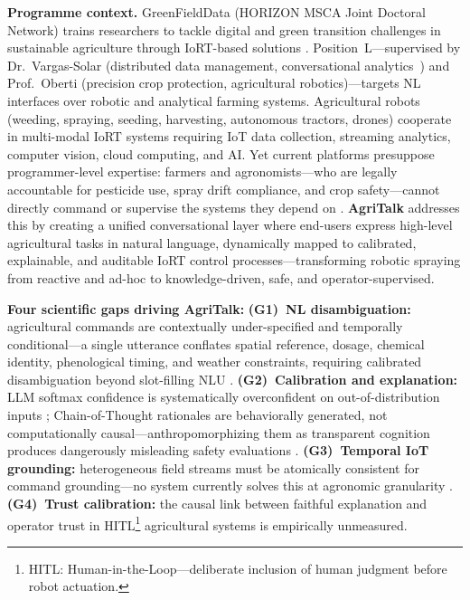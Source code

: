 \documentclass[11pt,a4paper]{article}
\begin{document}
\textbf{Programme context.}
GreenFieldData (HORIZON MSCA Joint Doctoral Network) trains researchers to tackle digital and green transition challenges in sustainable agriculture through IoRT-based solutions \citep{phd_adv_2026}.
Position~L---supervised by Dr.\ Vargas-Solar (distributed data management, conversational analytics~\citep{vargas_solar_2021}) and Prof.\ Oberti (precision crop protection, agricultural robotics)---targets NL interfaces over robotic and analytical farming systems.
Agricultural robots (weeding, spraying, seeding, harvesting, autonomous tractors, drones) cooperate in multi-modal IoRT systems requiring IoT data collection, streaming analytics, computer vision, cloud computing, and AI.
Yet current platforms presuppose programmer-level expertise: farmers and agronomists---who are legally accountable for pesticide use, spray drift compliance, and crop safety---cannot directly command or supervise the systems they depend on \citep{chen_2021,wagner_2025}.
\textbf{AgriTalk} addresses this by creating a unified conversational layer where end-users express high-level agricultural tasks in natural language, dynamically mapped to calibrated, explainable, and auditable IoRT control processes---transforming robotic spraying from reactive and ad-hoc to knowledge-driven, safe, and operator-supervised.

\textbf{Four scientific gaps driving AgriTalk:}
\textbf{(G1)~NL disambiguation:} agricultural commands are contextually under-specified and temporally conditional---a single utterance conflates spatial reference, dosage, chemical identity, phenological timing, and weather constraints, requiring calibrated disambiguation beyond slot-filling NLU \citep{chen_2021}.
\textbf{(G2)~Calibration and explanation:} LLM softmax confidence is systematically overconfident on out-of-distribution inputs \citep{guo_calibration_2017}; Chain-of-Thought rationales are behaviorally generated, not computationally causal---anthropomorphizing them as transparent cognition produces dangerously misleading safety evaluations \citep{turpin_2023,kambhampati_2025}.
\textbf{(G3)~Temporal IoT grounding:} heterogeneous field streams must be atomically consistent for command grounding---no system currently solves this at agronomic granularity \citep{vargas_solar_2021}.
\textbf{(G4)~Trust calibration:} the causal link between faithful explanation and operator trust in HITL\footnote{HITL: Human-in-the-Loop---deliberate inclusion of human judgment before robot actuation.} agricultural systems is empirically unmeasured.
\end{document}
